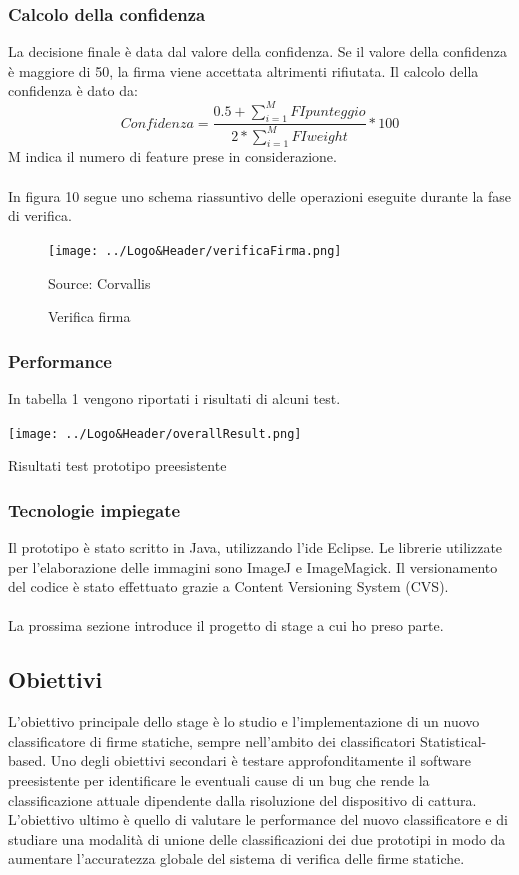 \subsubsection*{Calcolo della confidenza}
\label{2.1.4.5}
La decisione finale è data dal valore della confidenza. Se il valore della confidenza è maggiore di 50, la firma viene accettata altrimenti rifiutata. Il calcolo della confidenza è dato da:
\[Confidenza = \frac{0.5+\sum\limits_{i=1}^M FIpunteggio}{2*\sum\limits_{i=1}^M FIweight} * 100\]
M indica il numero di feature prese in considerazione.\\\\
In figura 10 segue uno schema riassuntivo delle operazioni eseguite durante la fase di verifica.
\begin{figure}[H]
\centering
\texttt{[image: ../Logo\&Header/verificaFirma.png]}
\caption{Verifica firma}Source: Corvallis
\end{figure}
\subsubsection*{Performance}
\label{2.1.4.6}
In tabella 1 vengono riportati i risultati di alcuni test.
\begin{table}[H]
  \label{tbl:excel-table}
  \centering
  \texttt{[image: ../Logo\&Header/overallResult.png]}
  \caption{Risultati test prototipo preesistente}
\end{table}
\subsubsection*{Tecnologie impiegate}
\label{2.1.4.7}
Il prototipo è stato scritto in Java, utilizzando l'ide Eclipse. Le librerie utilizzate per l'elaborazione delle immagini sono ImageJ e ImageMagick. Il versionamento del codice è stato effettuato grazie a Content Versioning System (CVS).\\\\
La prossima sezione introduce il progetto di stage a cui ho preso parte.
\subsection{Obiettivi}
\label{2.2}
L'obiettivo principale dello stage è lo studio e l'implementazione di un nuovo classificatore di firme statiche, sempre nell'ambito dei classificatori Statistical-based. Uno degli obiettivi secondari è testare approfonditamente il software preesistente per identificare le eventuali cause di un bug che rende la classificazione attuale dipendente dalla risoluzione del dispositivo di cattura. L'obiettivo ultimo è quello di valutare le performance del nuovo classificatore e di studiare una modalità di unione delle classificazioni dei due prototipi in modo da aumentare l'accuratezza globale del sistema di verifica delle firme statiche.
